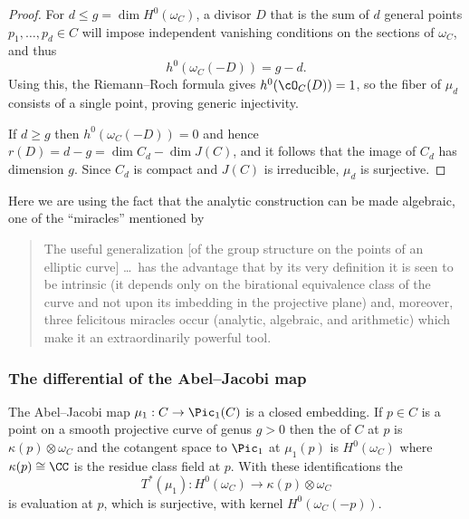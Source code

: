 \begin{proof}
For $d\leq g = \dim H^{0}(\omega_{C})$,  a divisor $D$ that is the sum of $d$ general points $p_{1}, \dots,  p_{d} \in C$ will impose independent vanishing conditions on the sections of $\omega_{C}$, and thus
$$
h^0(\omega_C(-D)) = g-d.
$$
 Using this, the 
%
Riemann--Roch formula
gives $h^{0}(\cO_{C}(D)) = 1$, so the fiber of 
$\mu_{d}$ consists of a single point, proving generic injectivity.

If $d \geq g$ then $h^0(\omega_C(-D)) = 0$ and hence $r(D) = d-g= \dim C_{d} - \dim J(C)$, and it follows that the image of $C_d$ has dimension $g$. Since $C_d$ is compact and $J(C)$ is irreducible, $\mu_{d}$ is surjective.
\end{proof}

Here we are using the fact that the analytic construction can be made algebraic, one of the ``miracles''
mentioned by 
%
\begin{quote}
The useful generalization [of the group structure on the points of an 
\null elliptic curve]
\dots\ has the advantage that by its
very definition it is seen to be intrinsic (it depends only on the birational
equivalence class of the curve and not upon its imbedding in the projective
plane) and, moreover, three felicitous miracles occur (analytic, algebraic, and
arithmetic) which make it an extraordinarily powerful tool. 
\\
\vrule width0pt\hfill \null\emdash  \cite{MazurBulletin}
\end{quote}

\subsubsection*{The differential of the Abel--Jacobi map}

\begin{theorem}
The Abel--Jacobi map 
%
$\mu_{1}: C\to \Pic_{1}(C)$ is a closed embedding.  
If $p\in C$ is a point on a smooth projective curve of genus $g>0$ then the 
%
of $C$
at $p$ is $\kappa(p) \otimes \omega_{C}$ and the cotangent space to $\Pic_{1}$ at $\mu_{1}(p)$ is
$H^{0}(\omega_{C})$ where $\kappa(p) \cong \CC$ is the residue class
field at $p$. With these identifications the 
%
$$
T^{*}(\mu_{1}): H^{0}(\omega_{C})  \to \kappa(p) \otimes \omega_{C}
$$
is evaluation at $p$, which is surjective, with kernel 
$H^{0}(\omega_{C}(-p))$. 
\end{theorem}


